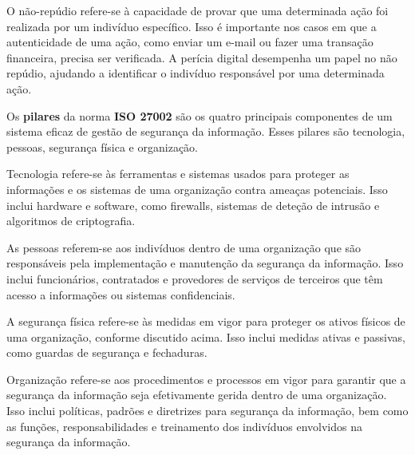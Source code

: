 O não-repúdio refere-se à capacidade de provar que uma determinada ação foi realizada por um indivíduo específico. Isso é importante nos casos em que a autenticidade de uma ação, como enviar um e-mail ou fazer uma transação financeira, precisa ser verificada. A perícia digital desempenha um papel no não repúdio, ajudando a identificar o indivíduo responsável por uma determinada ação.

Os \textbf{pilares} da norma \textbf{ISO 27002} são os quatro principais componentes de um sistema eficaz de gestão de segurança da informação. Esses pilares são tecnologia, pessoas, segurança física e organização.

Tecnologia refere-se às ferramentas e sistemas usados para proteger as informações e os sistemas de uma organização contra ameaças potenciais. Isso inclui hardware e software, como firewalls, sistemas de deteção de intrusão e algoritmos de criptografia.

As pessoas referem-se aos indivíduos dentro de uma organização que são responsáveis pela implementação e manutenção da segurança da informação. Isso inclui funcionários, contratados e provedores de serviços de terceiros que têm acesso a informações ou sistemas confidenciais.

A segurança física refere-se às medidas em vigor para proteger os ativos físicos de uma organização, conforme discutido acima. Isso inclui medidas ativas e passivas, como guardas de segurança e fechaduras.

Organização refere-se aos procedimentos e processos em vigor para garantir que a segurança da informação seja efetivamente gerida dentro de uma organização. Isso inclui políticas, padrões e diretrizes para segurança da informação, bem como as funções, responsabilidades e treinamento dos indivíduos envolvidos na segurança da informação.

\newpage
